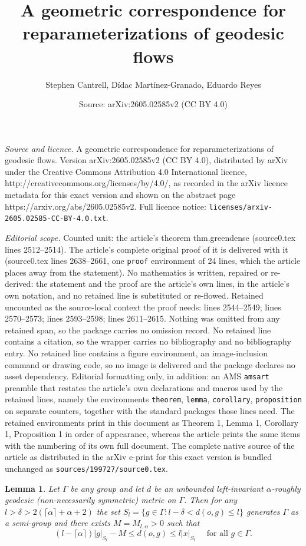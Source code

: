 \documentclass[10pt,a4paper]{amsart}
\title{A geometric correspondence for reparameterizations of geodesic flows}
\author{Stephen Cantrell, D\'idac Mart\'inez-Granado, Eduardo Reyes}
\date{Source: arXiv:2605.02585v2 (CC BY 4.0)}
\newtheorem{lemma}{Lemma}
\newcommand{\G}{\Gamma}
\newcommand{\al}{\alpha}
\newcommand{\del}{\delta}
\begin{document}
\maketitle

\noindent\emph{Source and licence.} A geometric correspondence for reparameterizations of geodesic flows. Version arXiv:2605.02585v2 (CC BY 4.0), distributed by arXiv under the Creative Commons Attribution 4.0 International licence, http://creativecommons.org/licenses/by/4.0/, as recorded in the arXiv licence metadata for this exact version and shown on the abstract page https://arxiv.org/abs/2605.02585v2. Full licence notice: \texttt{licenses/arxiv-2605.02585-CC-BY-4.0.txt}.\par\smallskip

\noindent\textit{Editorial scope.} Counted unit: the article's theorem thm.greendense (source0.tex lines 2512--2514). The article's complete original proof of it is delivered with it (source0.tex lines 2638--2661, one \texttt{proof} environment of 24 lines, which the article places away from the statement). No mathematics is written, repaired or re-derived: the statement and the proof are the article's own lines, in the article's own notation, and no retained line is substituted or re-flowed.  Retained uncounted as the source-local context the proof needs: lines 2544--2549; lines 2570--2573; lines 2593--2598; lines 2611--2615.  Nothing was omitted from any retained span, so the package carries no omission record.  No retained line contains a citation, so the wrapper carries no bibliography and no bibliography entry.  No retained line contains a figure environment, an image-inclusion command or drawing code, so no image is delivered and the package declares no asset dependency.  Editorial formatting only, in addition: an AMS \texttt{amsart} preamble that restates the article's own declarations and macros used by the retained lines, namely the environments \texttt{theorem}, \texttt{lemma}, \texttt{corollary}, \texttt{proposition} on separate counters, together with the standard packages those lines need.  The retained environments print in this document as Theorem 1, Lemma 1, Corollary 1, Proposition 1 in order of appearance, whereas the article prints the same items with the numbering of its own full document.  The complete native source of the article as distributed in the arXiv e-print for this exact version is bundled unchanged as \texttt{sources/199727/source0.tex}.
\begin{lemma}\label{lem.worddensesphere}
    Let $\G$ be any group and let $d$ be an unbounded left-invariant $\al$-roughly geodesic (non-necessarily symmetric) metric on $\G$. Then for any $l>\del>2(\lceil\al \rceil+\al+2)$ the set $S_l=\{g\in \G: l-\del<d(o,g)\leq l\}$ generates $\G$ as a semi-group and there exists $M=M_{l,\al}>0$ such that
\begin{equation}\label{eq.WMdensesphere}
        (l-\lceil{\al \rceil})|g|_{S_l}-M\leq d(o,g)\leq l|x|_{S_l} \quad \text{ for all }g\in \G.
    \end{equation}
\end{lemma}
\end{document}
